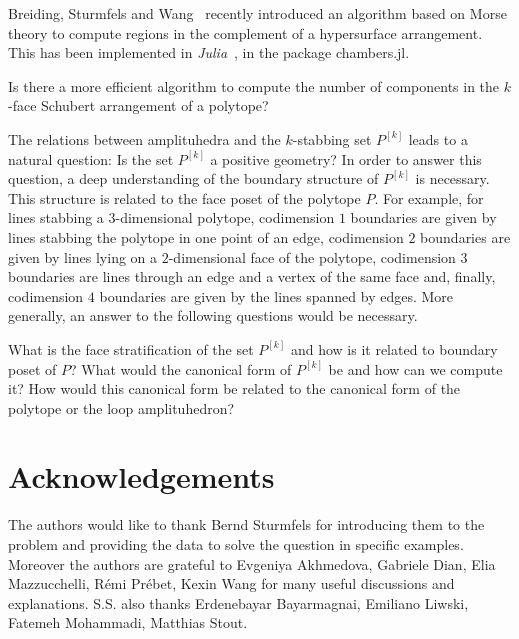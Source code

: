 \documentclass[english]{ourlematema}
\newcommand{\Pk}{P^{[k]}}
\begin{document}
Breiding, Sturmfels and Wang~\cite{computingarr} recently introduced an algorithm based on Morse theory to compute regions in the complement of a hypersurface arrangement. This has been implemented in {\em Julia}~\cite{julia}, in the package chambers.jl.

\begin{que}
    Is there a more efficient algorithm to compute the number of components in the $k$-face Schubert arrangement of a polytope?
\end{que}

The relations between amplituhedra and the $k$-stabbing set $\Pk$ leads to a natural question: Is the set $\Pk$ a positive geometry? In order to answer this question, a deep understanding of the boundary structure of $\Pk$ is necessary. This structure is related to the face poset of the polytope $P$. For example, for lines stabbing a $3$-dimensional polytope, codimension $1$ boundaries are given by lines stabbing the polytope in one point of an edge, codimension $2$ boundaries are given by lines lying on a $2$-dimensional face of the polytope, codimension $3$ boundaries are lines through an edge and a vertex of the same face and, finally, codimension $4$ boundaries are given by the lines spanned by edges. More generally, an answer to the following questions would be necessary.

\begin{que}
    What is the face stratification of the set $\Pk$ and how is it related to boundary poset of $P$? What would the canonical form of $\Pk$ be and how can we compute it? How would this canonical form be related to the canonical form of the polytope or the loop amplituhedron?
\end{que}



\section*{Acknowledgements} The authors would like to thank Bernd Sturmfels for introducing them to the problem and providing the data to solve the question in specific examples. Moreover the authors are grateful to Evgeniya Akhmedova, Gabriele Dian, Elia Mazzucchelli, Rémi Prébet, Kexin Wang for many useful discussions and explanations. S.S. also thanks Erdenebayar Bayarmagnai, Emiliano Liwski, Fatemeh Mohammadi, Matthias Stout.
\end{document}
